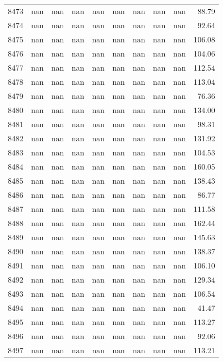 \begin{tabular}{lrrrrrrrrr}
8473 & nan & nan & nan & nan & nan & nan & nan & nan & 88.79 \\
8474 & nan & nan & nan & nan & nan & nan & nan & nan & 92.64 \\
8475 & nan & nan & nan & nan & nan & nan & nan & nan & 106.08 \\
8476 & nan & nan & nan & nan & nan & nan & nan & nan & 104.06 \\
8477 & nan & nan & nan & nan & nan & nan & nan & nan & 112.54 \\
8478 & nan & nan & nan & nan & nan & nan & nan & nan & 113.04 \\
8479 & nan & nan & nan & nan & nan & nan & nan & nan & 76.36 \\
8480 & nan & nan & nan & nan & nan & nan & nan & nan & 134.00 \\
8481 & nan & nan & nan & nan & nan & nan & nan & nan & 98.31 \\
8482 & nan & nan & nan & nan & nan & nan & nan & nan & 131.92 \\
8483 & nan & nan & nan & nan & nan & nan & nan & nan & 104.53 \\
8484 & nan & nan & nan & nan & nan & nan & nan & nan & 160.05 \\
8485 & nan & nan & nan & nan & nan & nan & nan & nan & 138.43 \\
8486 & nan & nan & nan & nan & nan & nan & nan & nan & 86.77 \\
8487 & nan & nan & nan & nan & nan & nan & nan & nan & 111.58 \\
8488 & nan & nan & nan & nan & nan & nan & nan & nan & 162.44 \\
8489 & nan & nan & nan & nan & nan & nan & nan & nan & 145.63 \\
8490 & nan & nan & nan & nan & nan & nan & nan & nan & 138.37 \\
8491 & nan & nan & nan & nan & nan & nan & nan & nan & 106.10 \\
8492 & nan & nan & nan & nan & nan & nan & nan & nan & 129.34 \\
8493 & nan & nan & nan & nan & nan & nan & nan & nan & 106.54 \\
8494 & nan & nan & nan & nan & nan & nan & nan & nan & 41.47 \\
8495 & nan & nan & nan & nan & nan & nan & nan & nan & 113.27 \\
8496 & nan & nan & nan & nan & nan & nan & nan & nan & 92.06 \\
8497 & nan & nan & nan & nan & nan & nan & nan & nan & 113.21 \\

\end{tabular}

